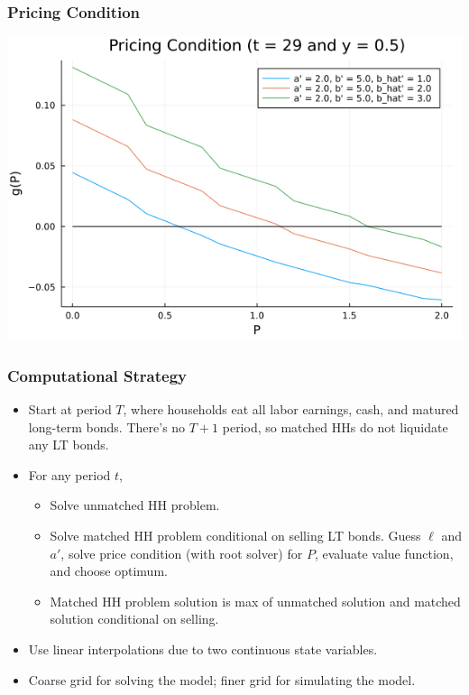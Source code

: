 \documentclass{beamer}
\begin{document}
\begin{frame}
\frametitle{Pricing Condition}

\includegraphics[scale = 0.5]{pricing_condition}

\end{frame}






\begin{frame}
\frametitle{Computational Strategy}
\begin{itemize}[<+->]
\item Start at period $T$, where households eat all labor earnings, cash, and matured long-term bonds. There's no $T+1$ period, so matched HHs do not liquidate any LT bonds.
\bigskip
\item For any period $t$, 
\begin{itemize}[<+->]
\item Solve unmatched HH problem.
\item Solve matched HH problem conditional on selling LT bonds. Guess $\ell$ and $a'$, solve price condition (with root solver) for $P$, evaluate value function, and choose optimum.
\item Matched HH problem solution is max of unmatched solution and matched solution conditional on selling.
\end{itemize}
\bigskip
\item Use linear interpolations due to two continuous state variables. 
\bigskip
\item Coarse grid for solving the model; finer grid for simulating the model.
\end{itemize}
\end{frame}
\end{document}
